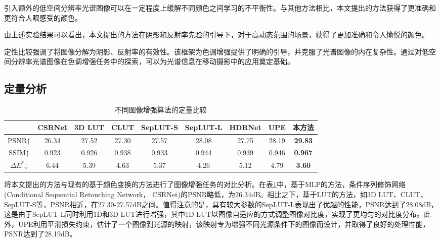 \documentclass[
    type = master, %
    degree = academic,        %
    decl-page,  %
  ]{njuthesis}
\begin{document}
引入额外的低空间分辨率光谱图像可以在一定程度上缓解不同颜色之间学习的不平衡性。与其他方法相比，本文提出的方法获得了更准确和更符合人眼感受的颜色。

由上述实验结果可以看出，本文提出的方法在阴影和反射率先验的引导下，对于高动态范围的场景，获得了更加准确和令人愉悦的颜色。

定性比较强调了将图像分解为阴影、反射率的有效性。该框架为色调增强提供了明确的引导，并克服了光谱图像的内在复杂性。通过对低空间分辨率光谱图像在色调增强任务中的探索，可以为光谱信息在移动摄影中的应用奠定基础。

\subsection{定量分析}
\begin{table}[h]
\caption{不同图像增强算法的定量比较}  %
\label{tab:j4} 
\begin{tabular}{c|cccccccc}
\hline
 & {CSRNet} & {3D\; LUT} & {CLUT} & {SepLUT-S} & {SepLUT-L} & {HDRNet} & UPE   &本方法            \\ \hline
PSNR↑                               & 26.34                      & 27.52                      & 27.30                    & 27.57                        & 28.08                        & 27.75                      & 28.19 & \textbf{29.83} \\
SSIM↑                                 & 0.923                      & 0.926                      & 0.938                    & 0.933                        & 0.944                        & 0.939                      & 0.946 & \textbf{0.967} \\
$\Delta E^*$↓                                   & 6.44                       & 5.39                       & 4.63                     & 5.37                         & 4.26                         & 5.12                       & 4.79  & \textbf{3.60} \\ \hline
\end{tabular}
\end{table}
将本文提出的方法与现有的基于颜色变换的方法进行了图像增强任务的对比分析。在表\ref{tab:j4}中，基于MLP的方法，条件序列修饰网络(Conditional Sequential Retouching Network， CSRNet)\cite{J14}的PSNR略低，为26.34dB。相比之下，基于LUT的方法，如3D\; LUT\cite{J38}、CLUT\cite{J40}、SepLUT-S\cite{J35}等，PSNR相近，在27.30-27.57dB之间。值得注意的是，具有较大参数的SepLUT-L表现出了优越的性能，PSNR达到了28.08dB，这是由于SepLUT-L同时利用1D和3D\; LUT进行增强，其中1D\; LUT以图像自适应的方式调整图像对比度，实现了更均匀的对比度分布。此外，UPE\cite{J33}利用平滑损失约束，估计了一个图像到光源的映射，该映射专为增强不同光源条件下的图像而设计，并取得了良好的处理性能，PSNR达到了28.19dB。
\end{document}
